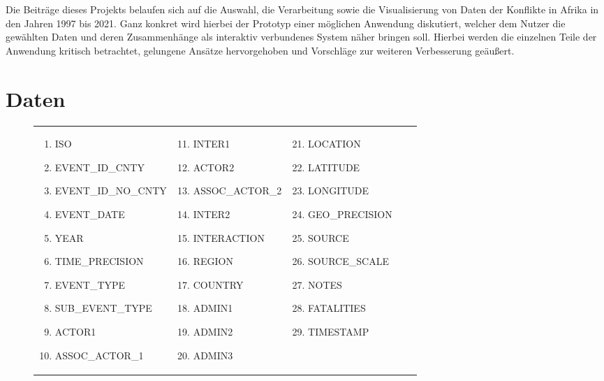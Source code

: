 \documentclass[usegeometry=true]{scrartcl}
\begin{document}
Die Beiträge dieses Projekts belaufen sich auf die Auswahl, die Verarbeitung sowie die Visualisierung von Daten der Konflikte in Afrika in den Jahren 1997 bis 2021. Ganz konkret wird hierbei der Prototyp einer möglichen Anwendung diskutiert, welcher dem Nutzer die gewählten Daten und deren Zusammenhänge als interaktiv verbundenes System näher bringen soll. Hierbei werden die einzelnen Teile der Anwendung kritisch betrachtet, gelungene Ansätze hervorgehoben und Vorschläge zur weiteren Verbesserung geäußert.

\section{Daten} \label{sec:daten}

\begin{figure}[]
\begin{center}

\begin{tabular}{lllll}
 \parbox{5.5cm}{
 \begin{enumerate}
  \item ISO
  \item EVENT\_ID\_CNTY
  \item EVENT\_ID\_NO\_CNTY
  \item EVENT\_DATE
  \item YEAR
  \item TIME\_PRECISION
  \item EVENT\_TYPE
  \item SUB\_EVENT\_TYPE
  \item ACTOR1
  \item ASSOC\_ACTOR\_1
 \end{enumerate}}
 &
 \parbox{4.5cm}{
 \begin{enumerate}
 \setcounter{enumi}{10}
  \item INTER1
  \item ACTOR2
  \item ASSOC\_ACTOR\_2
  \item INTER2
  \item INTERACTION
  \item REGION
  \item COUNTRY
  \item ADMIN1
  \item ADMIN2
  \item ADMIN3
 \end{enumerate}}
 &
 \parbox{5cm}{
 \begin{enumerate}
 \setcounter{enumi}{20}
  \item LOCATION
  \item LATITUDE
  \item LONGITUDE
  \item GEO\_PRECISION
  \item SOURCE
  \item SOURCE\_SCALE
  \item NOTES
  \item FATALITIES
  \item TIMESTAMP
 \end{enumerate}}


\end{tabular}
\end{center}
\end{figure}
\end{document}
